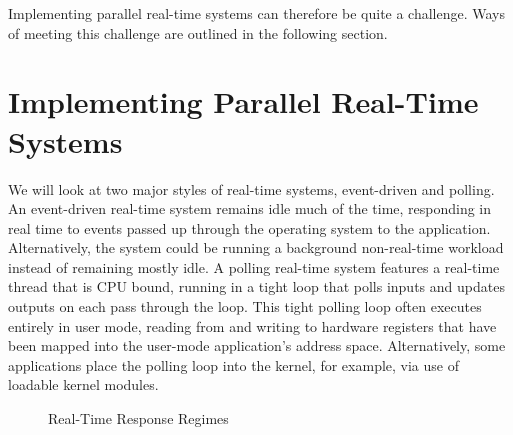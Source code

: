 Implementing parallel real-time systems can therefore be quite a
challenge.
Ways of meeting this challenge are outlined in the following section.

\section{Implementing Parallel Real-Time Systems}
\label{sec:rt:Implementing Parallel Real-Time Systems}

We will look at two major styles of real-time systems, event-driven and
polling.
An event-driven real-time system remains idle much of the time, responding
in real time to events passed up through the operating system to the
application.
Alternatively, the system could be running a background non-real-time
workload instead of remaining mostly idle.
A polling real-time system features a real-time thread that is CPU bound,
running in a tight loop that polls inputs and updates outputs on each
pass through the loop.
This tight polling loop often executes entirely in user mode, reading from
and writing to hardware registers that have been mapped into the user-mode
application's address space.
Alternatively, some applications place the polling loop into the kernel,
for example, via use of loadable kernel modules.

\begin{figure}[tb]
\centering
{}
\caption{Real-Time Response Regimes}
\label{fig:rt:Real-Time Response Regimes}
\end{figure}

